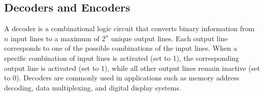 \documentclass[11pt]{report}
\begin{document}
\subsection{Decoders and Encoders}
\begin{definition}[Decoder]
    A decoder is a combinational logic circuit that converts binary information from $n$ input lines to a maximum of $2^n$ unique output lines. Each output line corresponds to one of the possible combinations of the input lines. When a specific combination of input lines is activated (set to 1), the corresponding output line is activated (set to 1), while all other output lines remain inactive (set to 0). Decoders are commonly used in applications such as memory address decoding, data multiplexing, and digital display systems.
    
\end{definition}
\end{document}
